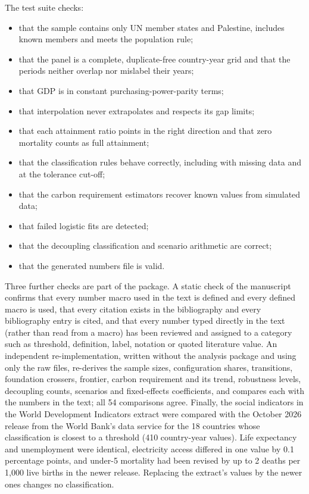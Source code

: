 The test suite checks:
\begin{itemize}
\item that the sample contains only UN member states and Palestine, includes known members and meets the population rule;
\item that the panel is a complete, duplicate-free country-year grid and that the periods neither overlap nor mislabel their years;
\item that GDP is in constant purchasing-power-parity terms;
\item that interpolation never extrapolates and respects its gap limits;
\item that each attainment ratio points in the right direction and that zero mortality counts as full attainment;
\item that the classification rules behave correctly, including with missing data and at the tolerance cut-off;
\item that the carbon requirement estimators recover known values from simulated data;
\item that failed logistic fits are detected;
\item that the decoupling classification and scenario arithmetic are correct;
\item that the generated numbers file is valid.
\end{itemize}
Three further checks are part of the package. A static check of the manuscript confirms that every number macro used in the text is defined and every defined macro is used, that every citation exists in the bibliography and every bibliography entry is cited, and that every number typed directly in the text (rather than read from a macro) has been reviewed and assigned to a category such as threshold, definition, label, notation or quoted literature value. An independent re-implementation, written without the analysis package and using only the raw files, re-derives the sample sizes, configuration shares, transitions, foundation crossers, frontier, carbon requirement and its trend, robustness levels, decoupling counts, scenarios and fixed-effects coefficients, and compares each with the numbers in the text; all 54 comparisons agree. Finally, the social indicators in the World Development Indicators extract were compared with the October 2026 release from the World Bank's data service for the 18 countries whose classification is closest to a threshold (410 country-year values). Life expectancy and unemployment were identical, electricity access differed in one value by 0.1 percentage points, and under-5 mortality had been revised by up to 2 deaths per 1{,}000 live births in the newer release. Replacing the extract's values by the newer ones changes no classification.

